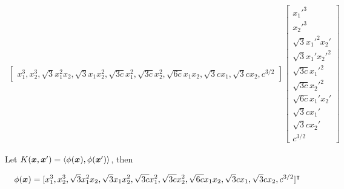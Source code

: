 \documentclass[10pt]{article}
\begin{document}
\def\A{
\begin{bmatrix}
    {x_1^3} , {x_2^3} , {\sqrt{3}{x_1^2}x_2} , {\sqrt{3}{x_1}x_2^2} , {\sqrt{3c}x_1^2} , {\sqrt{3c}x_2^2} ,{\sqrt{6c}{x_1}x_2} , {\sqrt{3}cx_1} ,  {\sqrt{3}cx_2} , c^{3/2}
\end{bmatrix}}

\def\B{
\begin{bmatrix}
	x_1'^3 \\
     	x_2'^3 \\
    	\sqrt{3}{x_1'^2}x_2' \\
	\sqrt{3}{x_1'}x_2'^2 \\
        	\sqrt{3c}x_1'^2 \\
	\sqrt{3c}x_2'^2 \\
	\sqrt{6c}{x_1'}x_2' \\
	\sqrt{3}cx_1' \\
	\sqrt{3}cx_2' \\
	c^{3/2}
\end{bmatrix}}


\begin{align*}
\A \B
\end{align*}



Let \( K(\boldsymbol{x},\boldsymbol{x}') = \langle \phi(\boldsymbol{x}), \phi(\boldsymbol{x}')\rangle \), then

$$ \phi(\boldsymbol{x})  = [ {x_1^3} , {x_2^3} , {\sqrt{3}{x_1^2}x_2} , {\sqrt{3}{x_1}x_2^2} , {\sqrt{3c}x_1^2} , {\sqrt{3c}x_2^2} ,{\sqrt{6c}{x_1}x_2} , {\sqrt{3}cx_1} ,  {\sqrt{3}cx_2} , c^{3/2}]^\intercal $$ 

\end{document}
